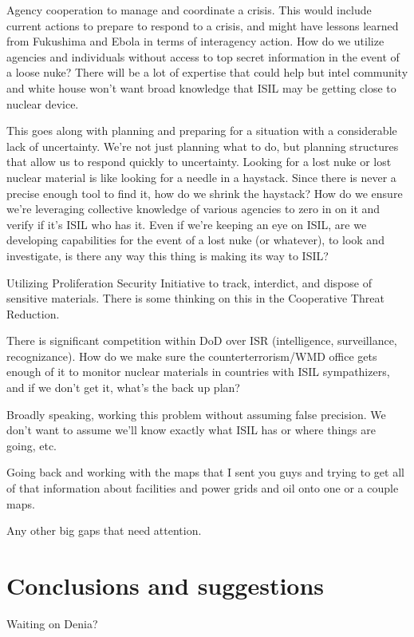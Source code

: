 \documentclass{report}
\begin{document}
Agency cooperation to manage and coordinate a crisis. This would include current actions to prepare to respond to a crisis, and might have lessons learned from Fukushima and Ebola in terms of interagency action. How do we utilize agencies and individuals without access to top secret information in the event of a loose nuke? There will be a lot of expertise that could help but intel community and white house won't want broad knowledge that ISIL may be getting close to nuclear device. 

This goes along with planning and preparing for a situation with a considerable lack of uncertainty. We're not just planning what to do, but planning structures that allow us to respond quickly to uncertainty. Looking for a lost nuke or lost nuclear material is like looking for a needle in a haystack. Since there is never a precise enough tool to find it, how do we shrink the haystack? How do we ensure we're leveraging collective knowledge of various agencies to zero in on it and verify if it's ISIL who has it. Even if we're keeping an eye on ISIL, are we developing capabilities for the event of a lost nuke (or whatever), to look and investigate, is there any way this thing is making its way to ISIL?

Utilizing Proliferation Security Initiative to track, interdict, and dispose of sensitive materials. There is some thinking on this in the Cooperative Threat Reduction.

There is significant competition within DoD over ISR (intelligence, surveillance, recognizance). How do we make sure the counterterrorism/WMD office gets enough of it to monitor nuclear materials in countries with ISIL sympathizers, and if we don't get it, what's the back up plan?

Broadly speaking, working this problem without assuming false precision. We don't want to assume we'll know exactly what ISIL has or where things are going, etc.

Going back and working with the maps that I sent you guys and trying to get all of that information about facilities and power grids and oil onto one or a couple maps. 

Any other big gaps that need attention.



\chapter{Conclusions and suggestions }

Waiting on Denia?
\end{document}
